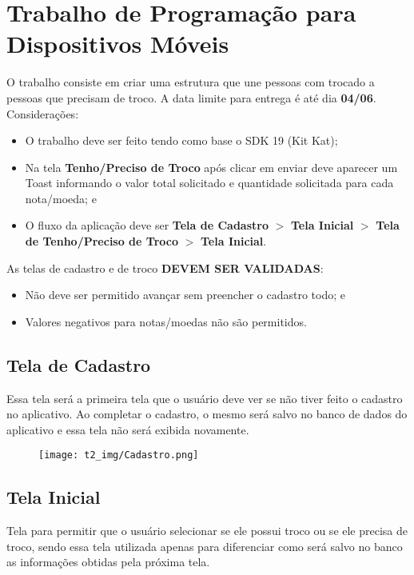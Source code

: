 \documentclass[a4paper,10pt]{article}
\begin{document}
\section*{Trabalho de Programação para Dispositivos Móveis}

O trabalho consiste em criar uma estrutura que une pessoas com trocado a pessoas que precisam de troco. A data limite para entrega é até dia \textbf{04/06}.
Considerações:
\begin{itemize}
  \item O trabalho deve ser feito tendo como base o SDK 19 (Kit Kat);
  \item Na tela \textbf{Tenho/Preciso de Troco} após clicar em enviar deve aparecer um Toast informando o valor total solicitado e quantidade solicitada para cada nota/moeda; e
  \item O fluxo da aplicação deve ser \textbf{Tela de Cadastro} $>$ \textbf{Tela Inicial} $>$ \textbf{Tela de Tenho/Preciso de Troco} $>$ \textbf{Tela Inicial}.
\end{itemize}

As telas de cadastro e de troco \textbf{DEVEM SER VALIDADAS}:
\begin{itemize}
 \item Não deve ser permitido avançar sem preencher o cadastro todo; e
 \item Valores negativos para notas/moedas não são permitidos.
\end{itemize}

\newpage

\subsection*{Tela de Cadastro}

Essa tela será a primeira tela que o usuário deve ver se não tiver feito o cadastro no aplicativo. Ao completar o cadastro, o mesmo será salvo no banco de dados do aplicativo e essa tela não será exibida novamente.

\begin{figure}[H]
    \centering
    \texttt{[image: t2\_img/Cadastro.png]}
\end{figure}

\newpage

\subsection*{Tela Inicial}

Tela para permitir que o usuário selecionar se ele possui troco ou se ele precisa de troco, sendo essa tela utilizada apenas para diferenciar como será salvo no banco as informações obtidas pela próxima tela.
\end{document}
